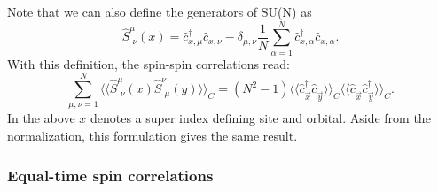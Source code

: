 Note that we  can also  define the generators of SU(N) as 
\begin{equation}
	\hat{S}^{\mu}_{\, \,  \nu} (x)  =  \hat{c}^{\dagger}_{x,\mu} \hat{c}^{}_{x,\nu}    - \delta_{\mu,\nu} \frac{1}{N}  \sum_{\alpha = 1}^{N} \hat{c}^{\dagger}_{x,\alpha} \hat{c}^{}_{x,\alpha}.   
\end{equation}
With this definition, the spin-spin correlations read: 
\begin{equation}
      \sum_{\mu,\nu=1}^{N}\langle \langle \hat{S}^{\mu}_{\, \,  \nu} (x)   \hat{S}^{\nu}_{\, \,  \mu} (y)  \rangle  \rangle_C =  
      (N^2-1)      \langle \langle \hat{c}^{\dagger}_{\vec{x} }   \hat{c}^{\phantom\dagger}_{\vec{y} } \rangle\rangle_C  \langle \langle   \hat{c}^{\phantom\dagger}_{\vec{x}}   \hat{c}^{\dagger}_{\vec{y} } \rangle\rangle_C . 
\end{equation}
In the above $x$ denotes a super index  defining site and orbital. Aside from the normalization, this formulation  gives the same result.  
\subsubsection{Equal-time spin correlations}


